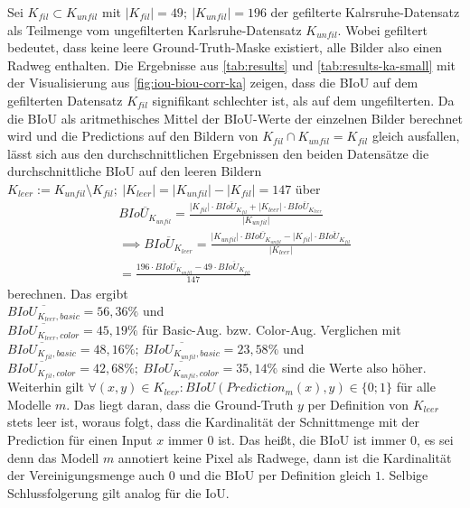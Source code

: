 Sei $K_{fil} \subset K_{unfil}$ mit $|K_{fil}| = 49; ~|K_{unfil}| = 196$ der gefilterte Kalrsruhe-Datensatz 
als Teilmenge vom ungefilterten Karlsruhe-Datensatz $K_{unfil}$. Wobei gefiltert bedeutet, dass 
keine leere Ground-Truth-Maske existiert, alle Bilder also einen Radweg enthalten.
Die Ergebnisse aus \autoref{tab:results} und \autoref{tab:results-ka-small} mit der Visualisierung aus 
\autoref{fig:iou-biou-corr-ka} zeigen, dass die BIoU auf dem gefilterten Datensatz $K_{fil}$ signifikant 
schlechter ist, als auf dem ungefilterten. Da die BIoU als aritmethisches Mittel der BIoU-Werte der einzelnen Bilder 
berechnet wird und die Predictions auf den Bildern von $K_{fil} \cap K_{unfil} = K_{fil}$ gleich ausfallen, 
lässt sich aus den durchschnittlichen Ergebnissen den beiden Datensätze die durchschnittliche BIoU auf den leeren Bildern 
$K_{leer} := K_{unfil} \setminus K_{fil};~ |K_{leer}| = |K_{unfil}| - |K_{fil}| = 147$ über   
\begin{align}
	\overbar{BIoU_{K_{unfil}}} = \frac{|K_{fil}| \cdot \overbar{BIoU_{K_{fil}}} + |K_{leer}| \cdot \overbar{BIoU_{K_{leer}}}}{|K_{unfil}|} \nonumber \\
	\label{eq:ka-empty}  \implies \overbar{BIoU_{K_{leer}}} = \frac{|K_{unfil}| \cdot \overbar{BIoU_{K_{unfil}}} - |K_{fil}| \cdot \overbar{BIoU_{K_{fil}}}}{|K_{leer}|} \\ 
	= \frac{196 \cdot \overbar{BIoU_{K_{unfil}}} - 49 \cdot \overbar{BIoU_{K_{fil}}}}{147} \nonumber
\end{align}
berechnen. Das ergibt \\ 
$\overbar{BIoU_{K_{leer}, basic}} = 56,36\%$ und \\ 
$\overbar{BIoU_{K_{leer}, color}} = 45,19\%$
für Basic-Aug. bzw. Color-Aug. Verglichen mit \\ 
$\overbar{BIoU_{K_{fil}, basic}} = 48,16\%; ~\overbar{BIoU_{K_{unfil}, basic}} = 23,58\%$ und \\
$\overbar{BIoU_{K_{fil}, color}} = 42,68\%; ~\overbar{BIoU_{K_{unfil}, color}} = 35,14\%$
sind die Werte also höher. Weiterhin gilt $\forall (x, y) \in K_{leer}: BIoU(Prediction_m(x), y) \in \{0; 1\}$ für alle Modelle $m$. 
Das liegt daran, dass die Ground-Truth $y$ per Definition von $K_{leer}$ stets leer ist, woraus folgt, dass die Kardinalität der 
Schnittmenge mit der Prediction für einen Input $x$ immer $0$ ist. Das heißt, die BIoU ist immer $0$, es sei denn 
das Modell $m$ annotiert keine Pixel als Radwege, dann ist die Kardinalität der Vereinigungsmenge auch $0$ und 
die BIoU per Definition gleich $1$. Selbige Schlussfolgerung gilt analog für die IoU. \\ 
